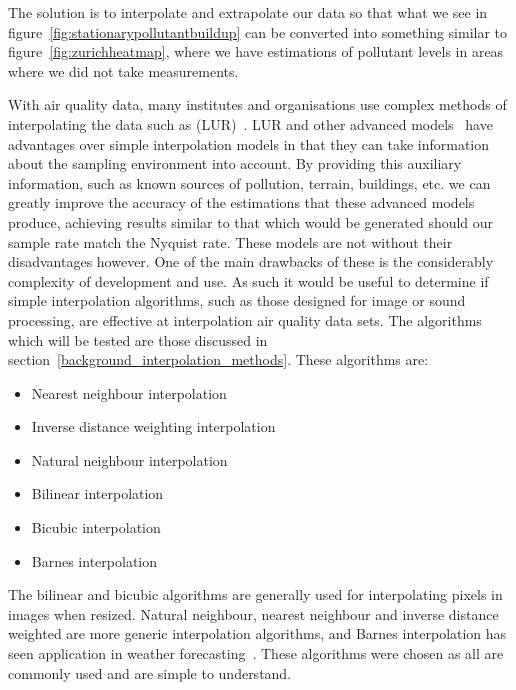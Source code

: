 
		The solution is to interpolate and extrapolate our data so that what we see in figure~\ref{fig:stationarypollutantbuildup} can be converted into something similar to figure~\ref{fig:zurichheatmap}, where we have estimations of pollutant levels in areas where we did not take measurements. 

		With air quality data, many institutes and organisations use complex methods of interpolating the data such as (LUR)~\cite{lurtraffic}. LUR and other advanced models~\cite{reviewofaqmodels} have advantages over simple interpolation models in that they can take information about the sampling environment into account. By providing this auxiliary information, such as known sources of pollution, terrain, buildings, etc. we can greatly improve the accuracy of the estimations that these advanced models produce, achieving results similar to that which would be generated should our sample rate match the Nyquist rate. These models are not without their disadvantages however. One of the main drawbacks of these is the considerably complexity of development and use. As such it would be useful to determine if simple interpolation algorithms, such as those designed for image or sound processing, are effective at interpolation air quality data sets. The algorithms which will be tested are those discussed in section~\ref{background_interpolation_methods}. These algorithms are: 

		\begin{itemize}
	        \item Nearest neighbour interpolation
			\item Inverse distance weighting interpolation
	        \item Natural neighbour interpolation
	        \item Bilinear interpolation
	        \item Bicubic interpolation
	        \item Barnes interpolation
	    \end{itemize}

	    The bilinear and bicubic algorithms are generally used for interpolating pixels in images when resized. Natural neighbour, nearest neighbour and inverse distance weighted are more generic interpolation algorithms, and Barnes interpolation has seen application in weather forecasting~\cite{barnesinterpolation}. These algorithms were chosen as all are commonly used and are simple to understand. 



